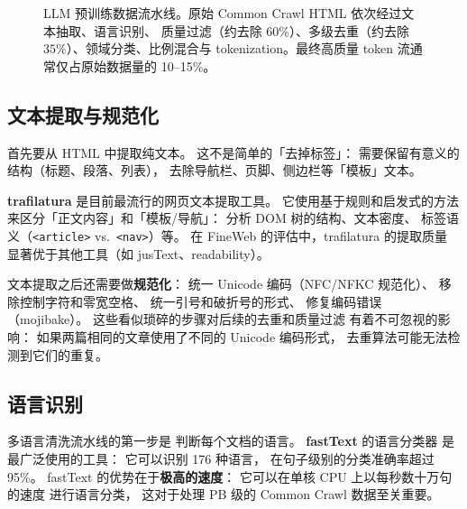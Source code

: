 \begin{figure}[htbp]
\caption{LLM 预训练数据流水线。原始 Common Crawl HTML 依次经过文本抽取、语言识别、
质量过滤（约去除 $60\%$）、多级去重（约去除 $35\%$）、领域分类、比例混合与
tokenization。最终高质量 token 流通常仅占原始数据量的 10--15\%。}
\label{fig:data-pipeline}
\end{figure}

\subsection{文本提取与规范化}

首先要从 HTML 中提取纯文本。
这不是简单的「去掉标签」：
需要保留有意义的结构（标题、段落、列表），
去除导航栏、页脚、侧边栏等「模板」文本。

\textbf{trafilatura} 是目前最流行的网页文本提取工具。
它使用基于规则和启发式的方法
来区分「正文内容」和「模板/导航」：
分析 DOM 树的结构、文本密度、
标签语义（\texttt{<article>} vs.\ \texttt{<nav>}）等。
在 FineWeb 的评估中，trafilatura 的提取质量
显著优于其他工具（如 jusText、readability）。

文本提取之后还需要做\textbf{规范化}：
统一 Unicode 编码（NFC/NFKC 规范化）、
移除控制字符和零宽空格、
统一引号和破折号的形式、
修复编码错误（mojibake）。
这些看似琐碎的步骤对后续的去重和质量过滤
有着不可忽视的影响：
如果两篇相同的文章使用了不同的 Unicode 编码形式，
去重算法可能无法检测到它们的重复。

\subsection{语言识别}

多语言清洗流水线的第一步是
判断每个文档的语言。
\textbf{fastText} 的语言分类器
是最广泛使用的工具：
它可以识别 176 种语言，
在句子级别的分类准确率超过 95\%。
fastText 的优势在于\textbf{极高的速度}：
它可以在单核 CPU 上以每秒数十万句的速度
进行语言分类，
这对于处理 PB 级的 Common Crawl 数据至关重要。


